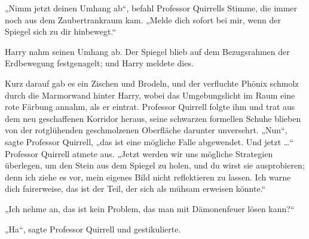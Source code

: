 „Nimm jetzt deinen Umhang ab“, befahl Professor Quirrells Stimme, die immer noch aus dem Zaubertrankraum kam.
„Melde dich sofort bei mir, wenn der Spiegel sich zu dir hinbewegt.“

Harry nahm seinen Umhang ab.
Der Spiegel blieb auf dem Bezugsrahmen der Erdbewegung festgenagelt; und Harry meldete dies.

Kurz darauf gab es ein Zischen und Brodeln, und der verfluchte Phönix schmolz durch die Marmorwand hinter Harry, wobei das Umgebungslicht im Raum eine rote Färbung annahm, als er eintrat. Professor Quirrell folgte ihm und trat aus dem neu geschaffenen Korridor heraus, seine schwarzen formellen Schuhe blieben von der rotglühenden geschmolzenen Oberfläche darunter unversehrt.
„Nun“, sagte Professor Quirrell, „das ist eine mögliche Falle abgewendet. Und jetzt …“ Professor Quirrell atmete aus.
„Jetzt werden wir uns mögliche Strategien überlegen, um den Stein aus dem Spiegel zu holen, und du wirst sie ausprobieren; denn ich ziehe es vor, mein eigenes Bild nicht reflektieren zu lassen. Ich warne dich fairerweise, das ist der Teil, der sich als mühsam erweisen könnte.“

„Ich nehme an, das ist kein Problem, das man mit Dämonenfeuer lösen kann?“

„Ha“, sagte Professor Quirrell und gestikulierte.

